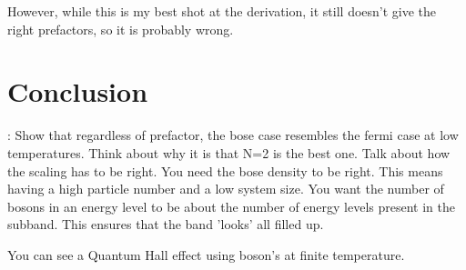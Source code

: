 \documentclass[12pt]{article}
\begin{document}
However, while this is my best shot at the derivation, it still doesn't
give the right prefactors, so it is probably wrong.

\section{Conclusion}: Show that regardless of prefactor, the bose case resembles the fermi case
at low temperatures. Think about why it is that N=2 is the best one. Talk about how the scaling
has to be right. You need the bose density to be right. This means having a high particle number
and a low system size. You want the number of bosons in an energy level to be about the number
of energy levels present in the subband. This ensures that the band 'looks' all filled up.

You can see a Quantum Hall effect using boson's at finite temperature. 
\end{document}
